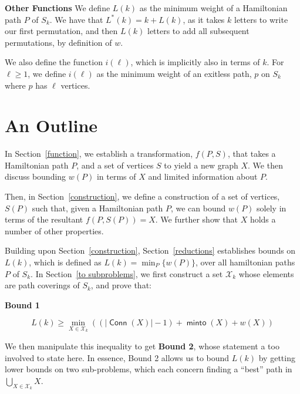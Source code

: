 \documentclass{article}
\DeclareMathOperator{\minto}{\bm{\mathsf{minto}}}
\DeclareMathOperator{\Conn}{\bm{\mathsf{Conn}}}
\newcommand{\edit}[1]{}%
\newcommand{\dc}[1]{}%
\begin{document}
\vspace{1.75em}

\textbf{Other Functions} We define $L(k)$ as the minimum weight of a Hamiltonian path $P$ of $S_k$. We have that $L^*(k) = k+L(k)$, as it takes $k$ letters to write our first permutation, and then $L(k)$ letters to add all subsequent permutations, by definition of $w$.

We also define the function $i(\ell)$, which is implicitly also in terms of $k$. For $\ell \geq 1$, we define $i(\ell)$ as the minimum weight of an exitless path, $p$ on $S_k$ where $p$ has $\ell$ vertices.

\section{An Outline}\edit{ needs a lot of work, sloppy currently; one can potentially find this useful as is, but is}

In Section~\ref{function}, we establish a transformation, $f(P,S)$, that takes a Hamiltonian path $P$, and a set of vertices $S$ to yield a new graph $X$. We then discuss bounding $w(P)$ in terms of $X$ and limited information about $P$.

Then, in Section~\ref{construction}, we define a construction of a set of vertices, $S(P)$ such that, given a Hamiltonian path $P$, we can bound $w(P)$ solely in terms of the resultant $f(P,S(P)) = X$. We further show that $X$ holds a number of other properties.\dc{ ``which are...'' or ``which let us...''}

\edit{summary of section 5 worked better in last version} Building upon Section~\ref{construction}, Section~\ref{reductions} establishes bounds on $L(k)$, which is defined as $L(k) = \min_{P}\{w(P)\}$, over all hamiltonian paths $P$ of $S_k$. In Section~\ref{to subproblems}, we first construct a set $\mathcal{X}_k$ whose elements are path coverings of $S_k$, and prove that:

\textbf{Bound 1}\edit{ use amsthm}

\[ L(k) \geq \min_{X \in \mathcal{X}_k}\left((|\Conn(X)|-1) + \minto(X) + w(X)\right) \]
\dc{Change definition of $\mathcal{X}$ to be dependent on $k$, so $\mathcal{X}_k$ makes sense.}

We then manipulate this inequality to get \textbf{Bound 2}\dc{ label/ref}, whose statement a too involved to state here. In essence, Bound 2 allows us to bound $L(k)$ by getting lower bounds on two sub-problems, which each concern finding a ``best''\dc{ ?} path in $\bigcup_{X \in \mathcal{X}_k} X$.\dc{ this paragraph is very mysterious and that's bad. You should be either more or less specific than you are now (probably more).}
\end{document}
